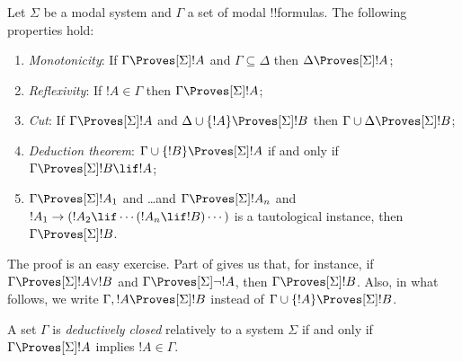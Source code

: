 \documentclass[../../../include/open-logic-section]{subfiles}
\begin{document}

\begin{prop}
  Let $\Sigma$ be a modal system and $\Gamma$ a set of modal
  !!{formula}s. The following properties hold:
  \begin{enumerate}
  \item{} \emph{Monotonicity}: If
    $\Gamma \Proves[\Sigma] !A$ and $\Gamma \subseteq \Delta$ then
    $\Delta \Proves[\Sigma] !A$;
  \item{}
    \emph{Reflexivity}: If $!A \in \Gamma$ then $\Gamma
    \Proves[\Sigma] !A$;
  \item{} \emph{Cut}: If $\Gamma
    \Proves[\Sigma] !A$ and $\Delta \cup \{!A\} \Proves[\Sigma] !B$
    then $\Gamma \cup \Delta \Proves[\Sigma] !B$;
  \item{} \emph{Deduction theorem}: $\Gamma \cup \{!B\}
    \Proves[\Sigma] !A$ if and only if $\Gamma \Proves[\Sigma] !B \lif
      !A$;
  \item {}%
    $\Gamma \Proves[\Sigma] !A_1$ and \dots and $\Gamma
    \Proves[\Sigma] !A_n$ and $!A_1 \to (!A_2 \lif \cdots (!A_n \lif
    !B)\cdots)$ is a tautological instance, then $\Gamma
    \Proves[\Sigma] !B$.
  \end{enumerate}
\end{prop}

The proof is an easy exercise. Part
 of 
gives us that, for instance, if $\Gamma \Proves[\Sigma] !A \lor !B$
and $\Gamma \Proves[\Sigma] \lnot !A$, then $\Gamma \Proves[\Sigma]
!B$. Also, in what follows, we write $\Gamma, !A \Proves[\Sigma] !B$
instead of $\Gamma \cup \{ !A\} \Proves[\Sigma] !B$.

\begin{defn}
  A set $\Gamma$ is \emph{deductively closed} relatively to a system
  $\Sigma$ if and only if $\Gamma \Proves[\Sigma] !A$ implies
  $!A \in \Gamma$.
\end{defn}
\end{document}
